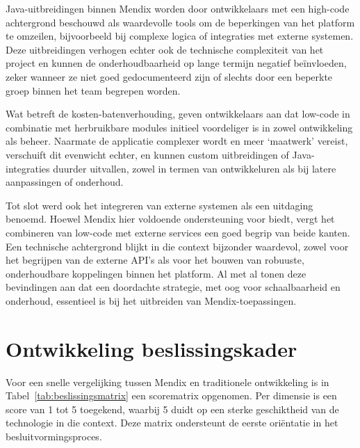 Java-uitbreidingen binnen Mendix worden door ontwikkelaars met een high-code achtergrond beschouwd als waardevolle tools om de beperkingen van het platform te omzeilen, bijvoorbeeld bij complexe logica of integraties met externe systemen. Deze uitbreidingen verhogen echter ook de technische complexiteit van het project en kunnen de onderhoudbaarheid op lange termijn negatief beïnvloeden, zeker wanneer ze niet goed gedocumenteerd zijn of slechts door een beperkte groep binnen het team begrepen worden.

Wat betreft de kosten-batenverhouding, geven ontwikkelaars aan dat low-code in combinatie met herbruikbare modules initieel voordeliger is in zowel ontwikkeling als beheer. Naarmate de applicatie complexer wordt en meer ‘maatwerk’ vereist, verschuift dit evenwicht echter, en kunnen custom uitbreidingen of Java-integraties duurder uitvallen, zowel in termen van ontwikkeluren als bij latere aanpassingen of onderhoud.

Tot slot werd ook het integreren van externe systemen als een uitdaging benoemd. Hoewel Mendix hier voldoende ondersteuning voor biedt, vergt het combineren van low-code met externe services een goed begrip van beide kanten. Een technische achtergrond blijkt in die context bijzonder waardevol, zowel voor het begrijpen van de externe API’s als voor het bouwen van robuuste, onderhoudbare koppelingen binnen het platform. Al met al tonen deze bevindingen aan dat een doordachte strategie, met oog voor schaalbaarheid en onderhoud, essentieel is bij het uitbreiden van Mendix-toepassingen.

\section{Ontwikkeling beslissingskader}
Voor een snelle vergelijking tussen Mendix en traditionele ontwikkeling is in Tabel~\ref{tab:beslissingsmatrix} een scorematrix opgenomen. Per dimensie is een score van 1 tot 5 toegekend, waarbij 5 duidt op een sterke geschiktheid van de technologie in die context. Deze matrix ondersteunt de eerste oriëntatie in het besluitvormingsproces.

